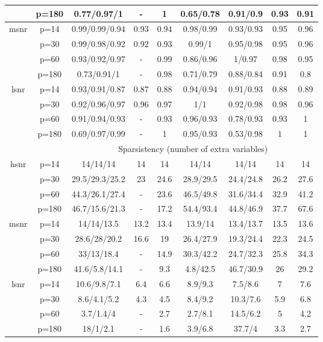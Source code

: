 \begin{table}[ht]
{\begin{tabular}{|c|c|ccccccc|}
   & p=180 & 0.77/0.97/1 & - & 1 & 0.65/0.78 & 0.91/0.9 & 0.93 & 0.91 \\ 
  \midrule\multirow{4}[2]{*}{msnr} & p=14 & 0.99/0.99/0.94 & 0.93 & 0.94 & 0.98/0.99 & 0.93/0.93 & 0.95 & 0.96 \\ 
   & p=30 & 0.99/0.98/0.92 & 0.92 & 0.93 & 0.99/1 & 0.95/0.98 & 0.95 & 0.96 \\ 
   & p=60 & 0.93/0.92/0.97 & - & 0.99 & 0.86/0.96 & 1/0.97 & 0.98 & 0.95 \\ 
   & p=180 & 0.73/0.91/1 & - & 0.98 & 0.71/0.79 & 0.88/0.84 & 0.91 & 0.8 \\ 
  \midrule\multirow{4}[2]{*}{lsnr} & p=14 & 0.93/0.91/0.87 & 0.87 & 0.88 & 0.94/0.94 & 0.91/0.93 & 0.88 & 0.89 \\ 
   & p=30 & 0.92/0.96/0.97 & 0.96 & 0.97 & 1/1 & 0.92/0.98 & 0.98 & 0.96 \\ 
   & p=60 & 0.91/0.94/0.93 & - & 0.93 & 0.96/0.93 & 0.78/0.93 & 0.93 & 1 \\ 
   & p=180 & 0.69/0.97/0.99 & - & 1 & 0.95/0.93 & 0.53/0.98 & 1 & 1 \\ 
   \midrule 
 \multicolumn{1}{|c}{} &       & \multicolumn{7}{c|}{Sparsistency (number of extra variables)} \\
\midrule\multirow{4}[2]{*}{hsnr} & p=14 & 14/14/14 & 14 & 14 & 14/14 & 14/14 & 14 & 14 \\ 
   & p=30 & 29.5/29.3/25.2 & 23 & 24.6 & 28.9/29.5 & 24.4/24.8 & 26.2 & 27.6 \\ 
   & p=60 & 44.3/26.1/27.4 & - & 23.6 & 46.5/49.8 & 31.6/34.4 & 32.9 & 41.2 \\ 
   & p=180 & 46.7/15.6/21.3 & - & 17.2 & 54.4/93.4 & 44.8/46.9 & 37.7 & 67.6 \\ 
  \midrule\multirow{4}[2]{*}{msnr} & p=14 & 14/14/13.5 & 13.2 & 13.4 & 13.9/14 & 13.4/13.7 & 13.5 & 13.6 \\ 
   & p=30 & 28.6/28/20.2 & 16.6 & 19 & 26.4/27.9 & 19.3/24.4 & 22.3 & 24.5 \\ 
   & p=60 & 33/13/18.4 & - & 14.9 & 30.3/42.2 & 24.7/32.3 & 25.8 & 34.3 \\ 
   & p=180 & 41.6/5.8/14.1 & - & 9.3 & 4.8/42.5 & 46.7/30.9 & 26 & 29.2 \\ 
  \midrule\multirow{4}[2]{*}{lsnr} & p=14 & 10.6/9.8/7.1 & 6.4 & 6.6 & 8.9/9.3 & 7.5/8.6 & 7 & 7.6 \\ 
   & p=30 & 8.6/4.1/5.2 & 4.3 & 4.5 & 8.4/9.2 & 10.3/7.6 & 5.9 & 6.8 \\ 
   & p=60 & 3.7/1.4/4 & - & 2.7 & 2.7/8.1 & 14.5/6.2 & 5 & 4.2 \\ 
   & p=180 & 18/1/2.1 & - & 1.6 & 3.9/6.8 & 37.7/4 & 3.3 & 2.7 \\ 
   \bottomrule 
\end{tabular}
}
\end{table}
